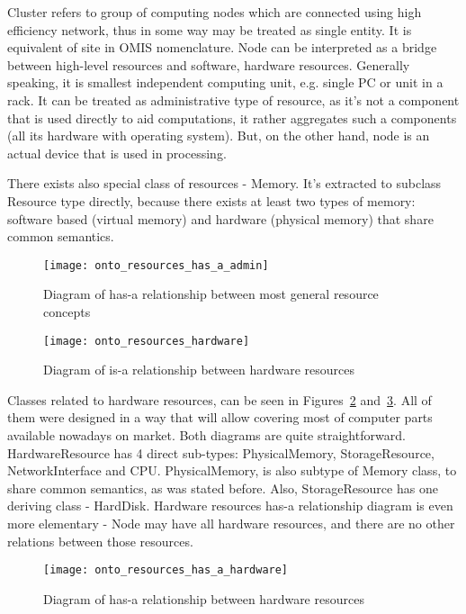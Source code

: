 Cluster refers to group of computing nodes which are connected using high efficiency network, thus in some way may be treated as single entity. It is equivalent of site in OMIS nomenclature\cite{tl9702e}. Node can be interpreted as a bridge between high-level resources and software, hardware resources. Generally speaking, it is smallest independent computing unit, e.g. single PC or unit in a rack. It can be treated as administrative type of resource, as it's not a component that is used directly to aid computations, it rather aggregates such a components (all its hardware with operating system). But, on the other hand, node is an actual device that is used in processing. 

There exists also special class of resources - Memory. It's extracted to subclass Resource type directly, because there exists at least two types of memory: software based (virtual memory) and hardware (physical memory) that share common semantics.

\begin{figure}[ht]
\centering
\texttt{[image: onto\_resources\_has\_a\_admin]}
\caption{Diagram of has-a relationship between most general resource concepts}
\label{fig:onto_resources_has_a_admin}
\end{figure}

\pagebreak

\begin{figure}[ht]
\centering
\texttt{[image: onto\_resources\_hardware]}
\caption{Diagram of is-a relationship between hardware resources}
\label{fig:onto_resources_hardware}
\end{figure}

Classes related to hardware resources, can be seen in Figures~\ref{fig:onto_resources_hardware} and~\ref{fig:onto_resources_has_a_hardware}. All of them were designed in a way that will allow covering most of computer parts available nowadays on market. Both diagrams are quite straightforward. HardwareResource has 4 direct sub-types: PhysicalMemory, StorageResource, NetworkInterface and CPU. PhysicalMemory, is also subtype of Memory class, to share common semantics, as was stated before. Also, StorageResource has one deriving class - HardDisk. Hardware resources has-a relationship diagram is even more elementary - Node may have all hardware resources, and there are no other relations between those resources. 

\begin{figure}[ht]
\centering
\texttt{[image: onto\_resources\_has\_a\_hardware]}
\caption{Diagram of has-a relationship between hardware resources}
\label{fig:onto_resources_has_a_hardware}
\end{figure}

